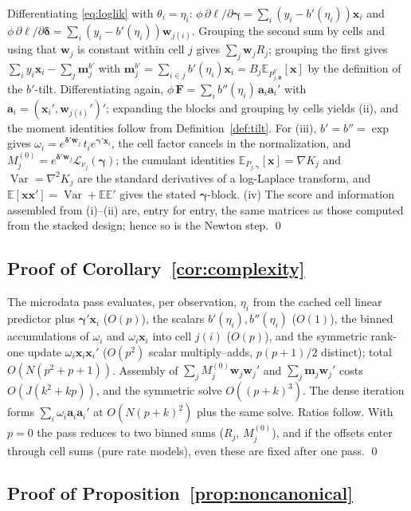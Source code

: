 \documentclass[11pt]{article}
\newcommand{\E}{\mathbb{E}}
\newcommand{\Var}{\operatorname{Var}}
\newcommand{\bgamma}{\bm{\gamma}}
\newcommand{\bdelta}{\bm{\delta}}
\newcommand{\btheta}{\bm{\theta}}
\newcommand{\bx}{\mathbf{x}}
\newcommand{\bw}{\mathbf{w}}
\newcommand{\ba}{\mathbf{a}}
\newcommand{\bF}{\mathbf{F}}
\begin{document}
Differentiating \eqref{eq:loglik} with $\theta_i = \eta_i$:
$\phi\,\partial\ell/\partial\bgamma = \sum_i (y_i - b'(\eta_i))\bx_i$ and
$\phi\,\partial\ell/\partial\bdelta = \sum_i (y_i - b'(\eta_i))
\bw_{j(i)}$.  Grouping the second sum by cells and using that $\bw_j$ is
constant within cell $j$ gives $\sum_j \bw_j R_j$; grouping the first
gives $\sum_i y_i \bx_i - \sum_j \mathbf{m}^{b'}_j$ with
$\mathbf{m}^{b'}_j = \sum_{i\in j} b'(\eta_i)\bx_i = B_j
\E_{P^{b'}_{j,\btheta}}[\bx]$ by the definition of the $b'$-tilt.
Differentiating again,
$\phi\,\bF = \sum_i b''(\eta_i)\, \ba_i \ba_i'$ with $\ba_i =
(\bx_i', \bw_{j(i)}')'$; expanding the blocks and grouping by cells
yields (ii), and the moment identities follow from
Definition~\ref{def:tilt}.  For (iii), $b' = b'' = \exp$ gives
$\omega_i = e^{\bdelta'\bw_j}\, t_i e^{\bgamma'\bx_i}$, the cell factor
cancels in the normalization, and $M_j^{(0)} = e^{\bdelta'\bw_j}
\mathcal{L}_{\nu_j}(\bgamma)$; the cumulant identities
$\E_{P_{j,\bgamma}}[\bx] = \nabla K_j$ and $\Var = \nabla^2 K_j$ are the
standard derivatives of a log-Laplace transform, and
$\E[\bx\bx'] = \Var + \E\E'$ gives the stated $\bgamma$-block.  (iv) The
score and information assembled from (i)--(ii) are, entry for entry, the
same matrices as those computed from the stacked design; hence so is the
Newton step. \qed

\subsection{Proof of Corollary~\ref{cor:complexity}}

The microdata pass evaluates, per observation, $\eta_i$ from the cached
cell linear predictor plus $\bgamma'\bx_i$ ($O(p)$), the scalars
$b'(\eta_i), b''(\eta_i)$ ($O(1)$), the binned accumulations of
$\omega_i$ and $\omega_i \bx_i$ into cell $j(i)$ ($O(p)$), and the
symmetric rank-one update $\omega_i \bx_i \bx_i'$ ($O(p^2)$ scalar
multiply--adds, $p(p+1)/2$ distinct); total $O(N(p^2 + p + 1))$.
Assembly of $\sum_j M_j^{(0)}\bw_j\bw_j'$ and $\sum_j \mathbf{m}_j\bw_j'$
costs $O(J(k^2 + kp))$, and the symmetric solve $O((p+k)^3)$.  The dense
iteration forms $\sum_i \omega_i \ba_i\ba_i'$ at $O(N(p+k)^2)$ plus the
same solve.  Ratios follow.  With $p = 0$ the pass reduces to two binned
sums ($R_j$, $M_j^{(0)}$), and if the offsets enter through cell sums
(pure rate models), even these are fixed after one pass. \qed

\subsection{Proof of Proposition~\ref{prop:noncanonical}}
\end{document}
